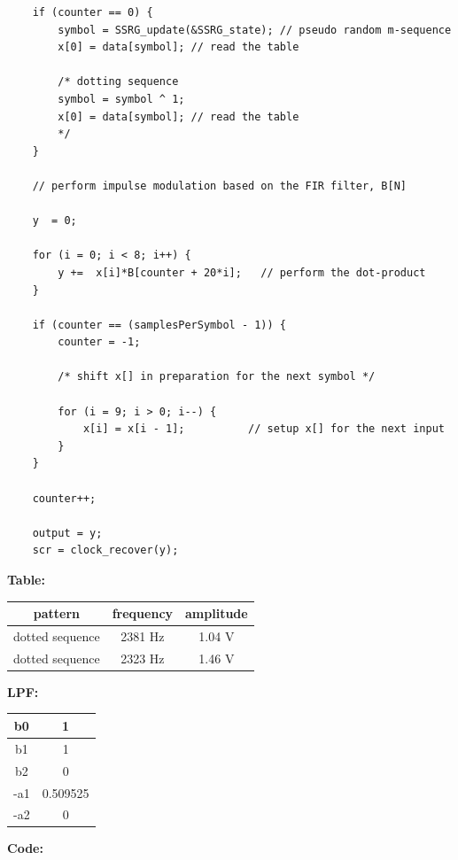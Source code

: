 \documentclass{article}
\begin{document}
\begin{verbatim}
	if (counter == 0) {
		symbol = SSRG_update(&SSRG_state); // pseudo random m-sequence
		x[0] = data[symbol]; // read the table

		/* dotting sequence
		symbol = symbol ^ 1;
		x[0] = data[symbol]; // read the table
		*/
	}

	// perform impulse modulation based on the FIR filter, B[N] 

	y  = 0;

	for (i = 0; i < 8; i++) {
		y +=  x[i]*B[counter + 20*i];	// perform the dot-product
	}

	if (counter == (samplesPerSymbol - 1)) {
		counter = -1; 

		/* shift x[] in preparation for the next symbol */

		for (i = 9; i > 0; i--) {
			x[i] = x[i - 1];          // setup x[] for the next input
		}
	}

	counter++;

	output = y;
	scr = clock_recover(y);
\end{verbatim}

\textbf{Table:}

\begin{center}
\begin{tabular}{c|c|c}
pattern	&	frequency & amplitude \\ \hline
dotted sequence	&	 2381 Hz	&	1.04 V				\\ \hline
dotted sequence	&	 2323 Hz	&	1.46 V				\\ \hline
\end{tabular}
\end{center}

\textbf{LPF:}

\begin{center}
\begin{tabular}{c|c}
b0	&	 1				\\ \hline
b1	&  1				\\ \hline
b2	&  0				\\ \hline
-a1	&	 0.509525\\ \hline
-a2	&	 0       \\ \hline
\end{tabular}
\end{center}

\textbf{Code:}
\end{document}
